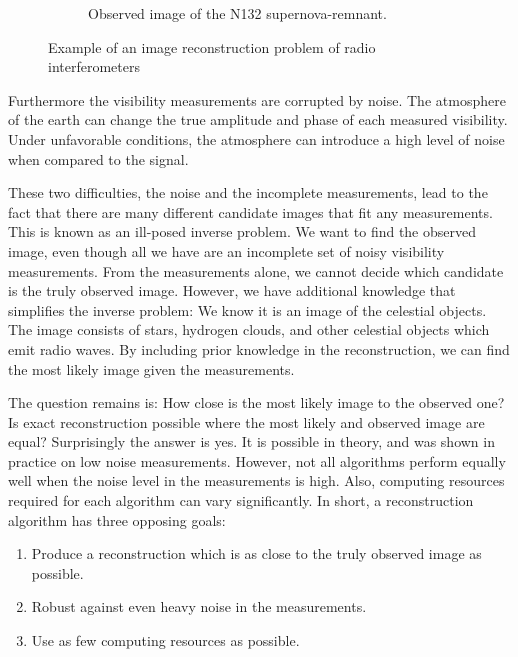 \begin{figure}[h]
\begin{subfigure}{0.4\linewidth}
		\caption{Observed image of the N132 supernova-remnant.}
		\label{intro:inversefig:rev}
	\end{subfigure}
	\caption{Example of an image reconstruction problem of radio interferometers}
	\label{intro:inversefig}
\end{figure}

Furthermore the visibility measurements are corrupted by noise. The atmosphere of the earth can change the true amplitude and phase of each measured visibility. Under unfavorable conditions, the atmosphere can introduce a high level of noise when compared to the signal.

These two difficulties, the noise and the incomplete measurements, lead to the fact that there are many different candidate images that fit any measurements.  This is known as an ill-posed inverse problem. We want to find the observed image, even though all we have are an incomplete set of noisy visibility measurements. From the measurements alone, we cannot decide which candidate is the truly observed image. However, we have additional knowledge that simplifies the inverse problem: We know it is an image of the celestial objects. The image consists of stars, hydrogen clouds, and other celestial objects which emit radio waves. By including prior knowledge in the reconstruction, we can find the most likely image given the measurements. 

The question remains is: How close is the most likely image to the observed one? Is exact reconstruction possible where the most likely and observed image are equal? Surprisingly the answer is yes. It is possible in theory\cite{candes2006robust,donoho2006compressed}, and was shown in practice on low noise measurements\cite{dabbech2018cygnus, dabbech2015moresane}. However, not all algorithms perform equally well when the noise level in the measurements is high. Also, computing resources required for each algorithm can vary significantly. In short, a reconstruction algorithm has three opposing goals:
\begin{enumerate}
	\item Produce a reconstruction which is as close to the truly observed image as possible.
	\item Robust against even heavy noise in the measurements.
	\item Use as few computing resources as possible.
\end{enumerate}

